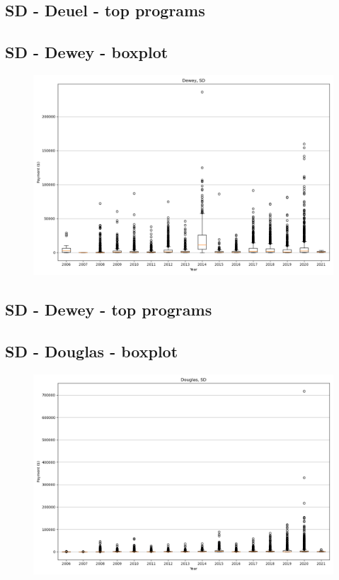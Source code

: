 \subsection*{SD - Deuel - top programs}

\newpage
\subsection*{SD - Dewey - boxplot}
\begin{figure}[h]
\centering
\includegraphics[width=7in]{../output/boxplots/counties/Dewey-SD_boxplot.png}
\end{figure}


\subsection*{SD - Dewey - top programs}

\newpage
\subsection*{SD - Douglas - boxplot}
\begin{figure}[h]
\centering
\includegraphics[width=7in]{../output/boxplots/counties/Douglas-SD_boxplot.png}
\end{figure}


